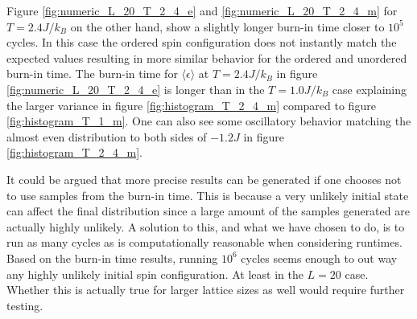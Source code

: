 \documentclass[english,notitlepage,reprint,nofootinbib]{revtex4-1}  %
\begin{document}
Figure \ref{fig:numeric_L_20_T_2_4_e} and \ref{fig:numeric_L_20_T_2_4_m} for $T=2.4 J/k_B$ on the other hand, show a slightly longer burn-in time closer to $10^5$ cycles. In this case the ordered spin configuration does not instantly match the expected values resulting in more similar behavior for the ordered and unordered burn-in time. The burn-in time for $\langle \epsilon \rangle$ at $T=2.4J/k_B$ in figure \ref{fig:numeric_L_20_T_2_4_e} is longer than in the $T=1.0 J/k_B$ case explaining the larger variance in figure \ref{fig:histogram_T_2_4_m} compared to figure \ref{fig:histogram_T_1_m}. One can also see some oscillatory behavior matching the almost even distribution to both sides of $-1.2 J$ in figure \ref{fig:histogram_T_2_4_m}.

It could be argued that more precise results can be generated if one chooses not to use samples from the burn-in time. This is because a very unlikely initial state can affect the final distribution since a large amount of the samples generated are actually highly unlikely. A solution to this, and what we have chosen to do, is to run as many cycles as is computationally reasonable when considering runtimes. Based on the burn-in time results, running $10^6$ cycles seems enough to out way any highly unlikely initial spin configuration. At least in the $L=20$ case. Whether this is actually true for larger lattice sizes as well would require further testing.
\end{document}
